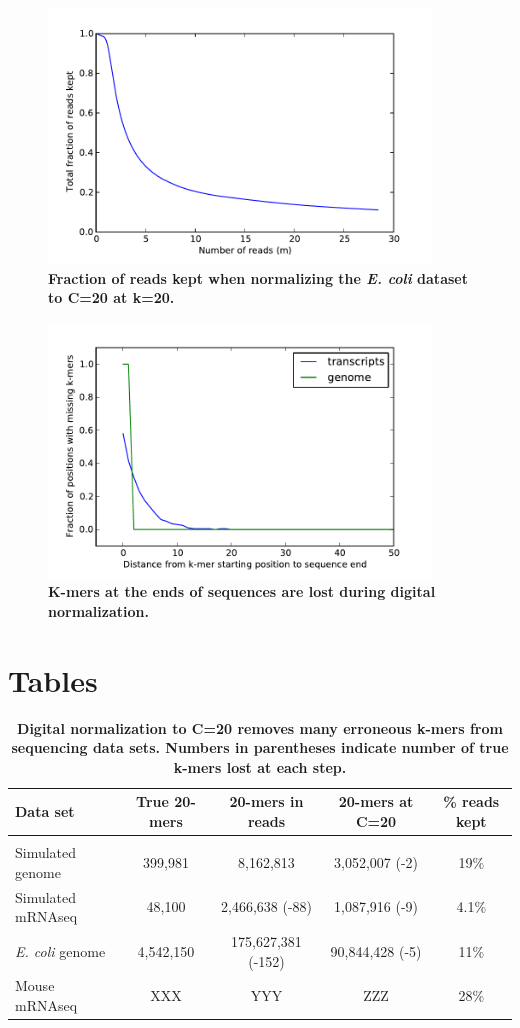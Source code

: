 \documentclass[10pt]{article}
\begin{document}
\begin{figure}
\includegraphics[width=4in]{diginorm-accumulation.pdf}
\caption{
{\bf Fraction of reads kept when normalizing the {\em E. coli} dataset to C=20 at k=20.}}
\label{fig:accumulate}
\end{figure}

\begin{figure}
\includegraphics[width=4in]{diginorm-endbias.pdf}
\caption{
{\bf K-mers at the ends of sequences are lost during digital normalization.}}
\label{fig:supplEnd}
\end{figure}

\section*{Tables}

\begin{table}[!ht]
\caption{
\bf{Digital normalization to C=20 removes many erroneous k-mers from sequencing data sets.  Numbers
in parentheses indicate number of true k-mers lost at each step.}}
\begin{tabular}{|l|c|c|c|c|}
Data set & True 20-mers & 20-mers in reads & 20-mers at C=20 & \% reads kept\\
\hline \\
Simulated genome & 399,981 & 8,162,813 & 3,052,007 (-2) & 19\% \\
Simulated mRNAseq & 48,100 & 2,466,638 (-88) & 1,087,916 (-9) & 4.1\% \\
{\em E. coli} genome & 4,542,150 & 175,627,381 (-152) & 90,844,428 (-5) & 11\% \\
Mouse mRNAseq & XXX & YYY & ZZZ & 28\% \\

\end{tabular}
\begin{flushleft}
\end{flushleft}
\label{tab:normC20}
\end{table}
\end{document}
